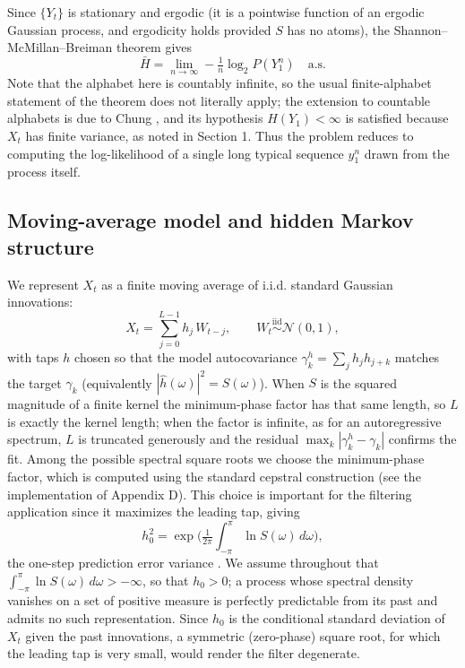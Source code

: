 \documentclass[11pt]{article}
\begin{document}
Since \(\{Y_t\}\) is stationary and ergodic (it is a pointwise function of an ergodic Gaussian process, and ergodicity holds provided \(S\) has no atoms), the Shannon--McMillan--Breiman theorem \cite{CoverThomas2006,Chung1961} gives
\[\bar H = \lim_{n\to\infty} -\tfrac1n \log_2 P(Y_1^n) \quad \text{a.s.}\]
Note that the alphabet here is countably infinite, so the usual finite-alphabet statement of the theorem does not literally apply; the extension to countable alphabets is due to Chung \cite{Chung1961}, and its hypothesis \(H(Y_1) < \infty\) is satisfied because \(X_t\) has finite variance, as noted in Section 1. Thus the problem reduces to computing the log-likelihood of a single long typical sequence \(y_1^n\) drawn from the process itself.

\subsection{Moving-average model and hidden Markov structure}\label{moving-average-model-and-hidden-markov-structure}

We represent \(X_t\) as a finite moving average of i.i.d. standard Gaussian innovations:
\[X_t = \sum_{j=0}^{L-1} h_j\,W_{t-j}, \qquad W_t \overset{\text{iid}}{\sim}\mathcal N(0,1),\]
with taps \(h\) chosen so that the model autocovariance \(\gamma^h_k = \sum_j h_j h_{j+k}\) matches the target \(\gamma_k\) (equivalently \(|\hat h(\omega)|^2 = S(\omega)\)). When \(S\) is the squared magnitude of a finite kernel the minimum-phase factor has that same length, so \(L\) is exactly the kernel length; when the factor is infinite, as for an autoregressive spectrum, \(L\) is truncated generously and the residual \(\max_k|\gamma^h_k - \gamma_k|\) confirms the fit. Among the possible spectral square roots we choose the minimum-phase factor, which is computed using the standard cepstral construction \cite[Ch.~13]{OppenheimSchafer2010} (see the implementation of Appendix D). This choice is important for the filtering application since it maximizes the leading tap, giving
\[h_0^2 = \exp\!\Big(\tfrac{1}{2\pi}\int_{-\pi}^{\pi}\ln S(\omega)\,d\omega\Big),\]
the one-step prediction error variance \cite{GrenanderSzego1958}. We assume throughout that \(\int_{-\pi}^{\pi}\ln S(\omega)\,d\omega > -\infty\), so that \(h_0 > 0\); a process whose spectral density vanishes on a set of positive measure is perfectly predictable from its past and admits no such representation. Since \(h_0\) is the conditional standard deviation of \(X_t\) given the past innovations, a symmetric (zero-phase) square root, for which the leading tap is very small, would render the filter degenerate.
\end{document}
